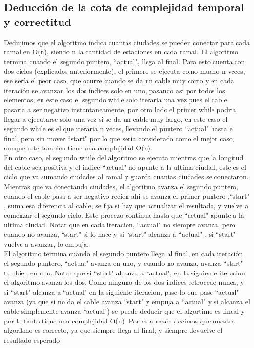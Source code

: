 \subsection{Deducción de la cota de complejidad temporal y correctitud}

Dedujimos que el algoritmo indica cuantas ciudades se pueden conectar para cada ramal en O(n), siendo n la cantidad de estaciones en cada ramal. El algoritmo termina cuando el segundo puntero, ``actual"$ $, llega al final. Para esto cuenta con dos ciclos (explicados anteriormente), el primero se ejecuta como mucho n veces, ese sería el peor caso, que ocurre cuando se da un cable muy corto y en cada iteración se avanzan los dos índices solo en uno, pasando asi por todos los elementos, en este caso el segundo while solo iteraria una vez pues el cable pasaria a ser negativo instantaneamente, por otro lado el primer while podria llegar a ejecutarse solo una vez si se da un cable muy largo, en este caso el segundo while es el que iteraria n veces, llevando el puntero ``actual"$ $ hasta el final, pero sin mover ``start"$ $ por lo que seria considerado como el mejor caso, aunque este tambien tiene una complejidad O(n).\\
En otro caso, el segundo while del algoritmo se ejecuta mientras que la longitud del cable sea positiva y el indice ``actual"$ $ no apunte a la ultima ciudad, este es el ciclo que va sumando ciudades al ramal y guarda cuantas ciudades se conectaron. Mientras que va conectando ciudades, el algoritmo avanza el segundo puntero, cuando el cable pasa a ser negativo recien ahi se avanza el primer puntero  ,``start"$ $,  suma esa diferencia al cable, se fija si hay que actualizar el resultado, y vuelve a comenzar el segundo ciclo. Este procezo continua hasta que ``actual"$ $ apunte a la ultima ciudad. Notar que en cada iteracion, ``actual"$ $ no siempre avanza, pero cuando no avanza, ``start"$ $ si lo hace y si ``start"$ $ alcanza a ``actual"$ $ , si ``start"$ $ vuelve a avanzar, lo empuja.\\

El algoritmo termina cuando el segundo puntero llega al final, en cada iteración el segundo puntero, ``actual"$ $ avanza en uno, y cuando no avanza, avanza ``start"$ $  tambien en uno. Notar que si ``start"$ $ alcanza a ``actual"$ $, en la siguiente iteracion el algoritmo avanza los dos. Como ninguno de los dos indices retrocede nunca, y si ``start"$ $ alcanza a ``actual"$ $ en la siguiente iteracion, pase lo que pase ``actual"$ $ avanza (ya que si no da el cable avanza ``start"$ $ y empuja a ``actual"$ $ y si alcanza el cable simplemente avanza ``actual"$ $) se puede deducir que el algortimo es lineal y por lo tanto tiene una complejidad O(n). Por esta razón decimos que nuestro algoritmo es correcto, ya que siempre llega al final, y siempre devuelve el resultado esperado

